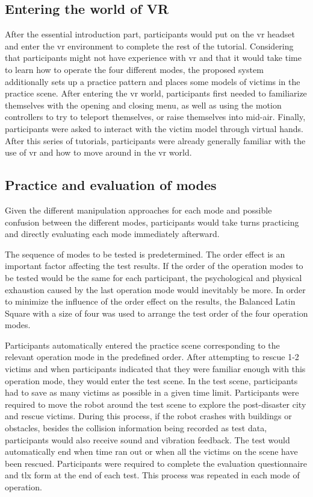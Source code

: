 \subsection{Entering the world of VR}
After the essential introduction part, participants would put on the \gls{vr} headset and enter the \gls{vr} environment to complete the rest of the tutorial. Considering that participants might not have experience with \gls{vr} and that it would take time to learn how to operate the four different modes, the proposed system additionally sets up a practice pattern and places some models of victims in the practice scene. After entering the \gls{vr} world, participants first needed to familiarize themselves with the opening and closing menu, as well as using the motion controllers to try to teleport themselves, or raise themselves into mid-air. Finally, participants were asked to interact with the victim model through virtual hands. After this series of tutorials, participants were already generally familiar with the use of \gls{vr} and how to move around in the \gls{vr} world.



\subsection{Practice and evaluation of modes}
Given the different manipulation approaches for each mode and possible confusion between the different modes, participants would take turns practicing and directly evaluating each mode immediately afterward. 

The sequence of modes to be tested is predetermined. The order effect is an important factor affecting the test results. If the order of the operation modes to be tested would be the same for each participant, the psychological and physical exhaustion caused by the last operation mode would inevitably be more. In order to minimize the influence of the order effect on the results, the Balanced Latin Square with a size of four was used to arrange the test order of the four operation modes.

Participants automatically entered the practice scene corresponding to the relevant operation mode in the predefined order. After attempting to rescue 1-2 victims and when participants indicated that they were familiar enough with this operation mode, they would enter the test scene. In the test scene, participants had to save as many victims as possible in a given time limit. Participants were required to move the robot around the test scene to explore the post-disaster city and rescue victims. During this process, if the robot crashes with buildings or obstacles, besides the collision information being recorded as test data, participants would also receive sound and vibration feedback. The test would automatically end when time ran out or when all the victims on the scene have been rescued. Participants were required to complete the evaluation questionnaire and \gls{tlx} form at the end of each test. This process was repeated in each mode of operation. 

